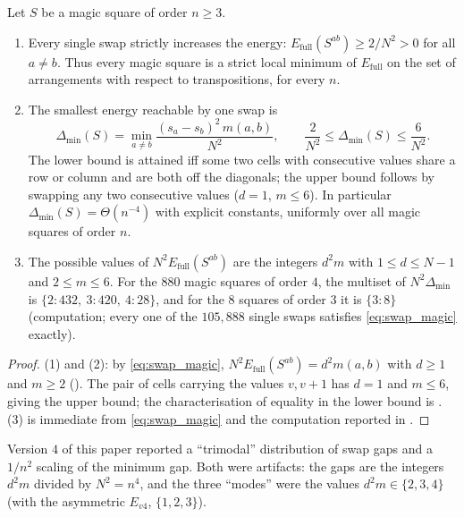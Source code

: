 \begin{corollary}
\label{cor:local_min}
Let $S$ be a magic square of order $n\ge3$.
\begin{enumerate}
\item Every single swap strictly increases the energy: $E_{\mathrm{full}}(S^{ab})\ge 2/N^{2}>0$ for all $a\ne b$.
Thus every magic square is a strict local minimum of $E_{\mathrm{full}}$ on the set of arrangements with respect to transpositions, for every $n$.
\item The smallest energy reachable by one swap is
\[
\Delta_{\min}(S)=\min_{a\ne b}\frac{(s_a-s_b)^{2}\,m(a,b)}{N^{2}},\qquad
\frac{2}{N^{2}}\le\Delta_{\min}(S)\le\frac{6}{N^{2}} .
\]
The lower bound is attained iff some two cells with consecutive values share a row or column and are both off the
diagonals; the upper bound follows by swapping any two consecutive values ($d=1$, $m\le6$).
In particular $\Delta_{\min}(S)=\Theta(n^{-4})$ with explicit constants, uniformly over all magic squares of order $n$.
\item The possible values of $N^{2}E_{\mathrm{full}}(S^{ab})$ are the integers $d^{2}m$ with $1\le d\le N-1$ and $2\le m\le6$.
For the $880$ magic squares of order $4$, the multiset of $N^{2}\Delta_{\min}$ is $\{2:432,\ 3:420,\ 4:28\}$, and for the
$8$ squares of order $3$ it is $\{3:8\}$ (computation; every one of the $105{,}888$ single swaps satisfies \eqref{eq:swap_magic} exactly).
\end{enumerate}
\end{corollary}

\begin{proof}
(1) and (2): by \eqref{eq:swap_magic}, $N^{2}E_{\mathrm{full}}(S^{ab})=d^{2}m(a,b)$ with $d\ge1$ and $m\ge2$
().  The pair of cells carrying the values $v,v+1$ has $d=1$ and $m\le6$, giving the upper bound;
the characterisation of equality in the lower bound is .  (3) is immediate from \eqref{eq:swap_magic}
and the computation reported in .
\end{proof}

\begin{remark}
\label{rem:v4_gap}
Version $4$ of this paper reported a ``trimodal'' distribution of swap gaps and a $1/n^{2}$ scaling of the minimum gap.
Both were artifacts: the gaps are the integers $d^{2}m$ divided by $N^{2}=n^{4}$, and the three ``modes'' were the
values $d^{2}m\in\{2,3,4\}$ (with the asymmetric $E_{v4}$, $\{1,2,3\}$).
\end{remark}

